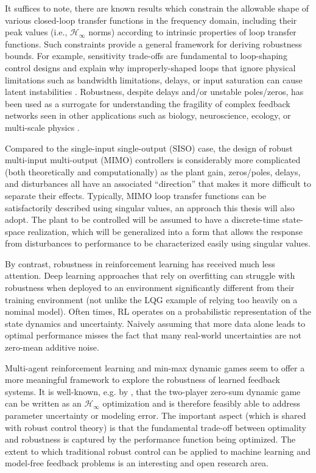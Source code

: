 It suffices to note, there are known results which constrain the allowable shape of various closed-loop transfer functions in the frequency domain, including their peak values (i.e., $\mathcal{H}_{\infty}$ norms) according to intrinsic properties of loop transfer functions.  Such constraints provide a general framework for deriving robustness bounds.  For example, sensitivity trade-offs are fundamental to loop-shaping control designs and explain why improperly-shaped loops that ignore physical limitations such as bandwidth limitations, delays, or input saturation can cause latent instabilities \cite{stein2003respect}.  Robustness, despite delays and/or unstable poles/zeros, has been used as a surrogate for understanding the fragility of complex feedback networks seen in other applications such as biology, neuroscience, ecology, or multi-scale physics \cite{doyle2011universal, leong2016understanding, doyle2017universal}.

Compared to the single-input single-output (SISO) case, the design of robust multi-input multi-output (MIMO) controllers is considerably more complicated (both theoretically and computationally) as the plant gain, zeros/poles, delays, and disturbances all have an associated ``direction'' that makes it more difficult to separate their effects.  Typically, MIMO loop transfer functions can be satisfactorily described using singular values, an approach this thesis will also adopt.  The plant to be controlled will be assumed to have a discrete-time state-space realization, which will be generalized into a form that allows the response from disturbances to performance to be characterized easily using singular values.

By contrast, robustness in reinforcement learning has received much less attention.  Deep learning approaches that rely on overfitting can struggle with robustness when deployed to an environment significantly different from their training environment (not unlike the LQG example of relying too heavily on a nominal model).  Often times, RL operates on a probabilistic representation of the state dynamics and uncertainty.  Naively assuming that more data alone leads to optimal performance misses the fact that many real-world uncertainties are not zero-mean additive noise.

Multi-agent reinforcement learning and min-max dynamic games seem to offer a more meaningful framework to explore the robustness of learned feedback systems.  It is well-known, e.g. by \cite{basar1989dynamic, rhee1991game, lee1990interconnections, bernhard1991lecture, bacsar2008h}, that the two-player zero-sum dynamic game can be written as an $\mathcal{H}_{\infty}$ optimization and is therefore feasibly able to address parameter uncertainty or modeling error.  The important aspect (which is shared with robust control theory) is that the fundamental trade-off between optimality and robustness is captured by the performance function being optimized.  The extent to which traditional robust control can be applied to machine learning and model-free feedback problems is an interesting and open research area.

